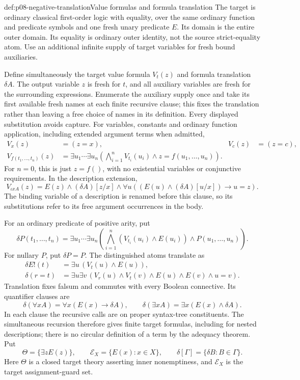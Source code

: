 \begin{hbdefinition}{def:p08-negative-translation}{Value formulas and formula translation}
The target is ordinary classical first-order logic with equality, over the
same ordinary function and predicate symbols and one fresh unary predicate
\(E\).  Its domain is the entire outer domain.  Its equality is ordinary
outer identity, not the source strict-equality atom.  Use an additional
infinite supply of target variables for fresh bound auxiliaries.

Define simultaneously the target value formula \(V_t(z)\) and formula
translation \(\delta A\).  The output variable \(z\) is fresh for \(t\),
and all auxiliary variables are fresh for the surrounding expressions.
Enumerate the auxiliary supply once and take its first available fresh
names at each finite recursive clause; this fixes the translation rather
than leaving a free choice of names in its definition.  Every displayed
substitution avoids capture.  For variables, constants and ordinary function
application, including extended argument terms when admitted,
\[
\begin{aligned}
 V_x(z)&=(z=x),& V_c(z)&=(z=c),\\
 V_{f(t_1,\ldots,t_n)}(z)
 &=\exists u_1\cdots\exists u_n
   \left(\bigwedge_{i=1}^{n}V_{t_i}(u_i)
               \land z=f(u_1,\ldots,u_n)\right).
\end{aligned}
\]
For \(n=0\), this is just \(z=f()\), with no existential variables or
conjunctive requirements.  In the description extension,
\[
 V_{\iota xA}(z)=E(z)\land(\delta A)[z/x]\land
   \forall u\left((E(u)\land(\delta A)[u/x])\to u=z\right).
\]
The binding variable of a description is renamed before this clause, so its
substitutions refer to its free argument occurrences in the body.

For an ordinary predicate of positive arity, put
\[
 \delta P(t_1,\ldots,t_n)=
 \exists u_1\cdots\exists u_n
 \left(\bigwedge_{i=1}^{n}(V_{t_i}(u_i)\land E(u_i))
                    \land P(u_1,\ldots,u_n)\right).
\]
For nullary \(P\), put \(\delta P=P\).  The distinguished atoms translate as
\[
\begin{aligned}
 \delta E!(t)&=\exists u\,(V_t(u)\land E(u)),\\
 \delta(r=t)&=\exists u\exists v\,
       (V_r(u)\land V_t(v)\land E(u)\land E(v)\land u=v).
\end{aligned}
\]
Translation fixes falsum and commutes with every Boolean connective.  Its
quantifier clauses are
\[
 \delta(\forall xA)=\forall x(E(x)\to\delta A),\qquad
 \delta(\exists xA)=\exists x(E(x)\land\delta A).
\]
In each clause the recursive calls are on proper syntax-tree constituents.
The simultaneous recursion therefore gives finite target formulas, including
for nested descriptions; there is no circular definition of a term by the
adequacy theorem.  Put
\[
 \Theta=\{\exists zE(z)\},\qquad
 \mathcal E_X=\{E(x):x\in X\},\qquad
 \delta[\Gamma]=\{\delta B:B\in\Gamma\}.
\]
Here \(\Theta\) is a closed target theory asserting inner nonemptiness,
and \(\mathcal E_X\) is the target assignment-guard set.
\end{hbdefinition}

